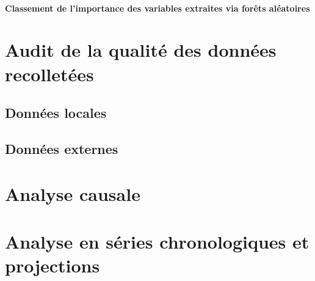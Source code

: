 	\paragraph{Classement de l'importance des variables extraites via forêts aléatoires}
	\section{Audit de la qualité des données recolletées}
	\subsection{Données locales}
	\subsection{Données externes}
	\section{Analyse causale}
	\section{Analyse en séries chronologiques et projections}